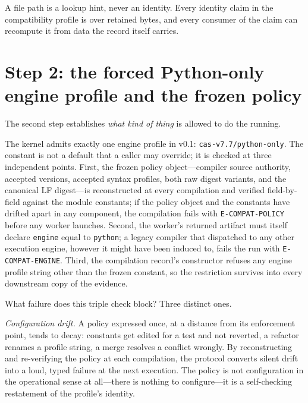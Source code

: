 \begin{ruleenv}\label{ch07:rule:no-path-authority}
A file path is a lookup hint, never an identity. Every identity claim in the compatibility profile is over retained bytes, and every consumer of the claim can recompute it from data the record itself carries.
\end{ruleenv}

\section{Step 2: the forced Python-only engine profile and the frozen policy}\label{ch07:step2}

The second step establishes \emph{what kind of thing} is allowed to do the running.

The kernel admits exactly one engine profile in v0.1: \texttt{cas-v7.7/python-only}. The constant is not a default that a caller may override; it is checked at three independent points. First, the frozen policy object---compiler source authority, accepted versions, accepted syntax profiles, both raw digest variants, and the canonical LF digest---is reconstructed at every compilation and verified field-by-field against the module constants; if the policy object and the constants have drifted apart in any component, the compilation fails with \texttt{E-COMPAT-POLICY} before any worker launches. Second, the worker's returned artifact must itself declare \texttt{engine} equal to \texttt{python}; a legacy compiler that dispatched to any other execution engine, however it might have been induced to, fails the run with \texttt{E-COMPAT-ENGINE}. Third, the compilation record's constructor refuses any engine profile string other than the frozen constant, so the restriction survives into every downstream copy of the evidence.

What failure does this triple check block? Three distinct ones.

\emph{Configuration drift.} A policy expressed once, at a distance from its enforcement point, tends to decay: constants get edited for a test and not reverted, a refactor renames a profile string, a merge resolves a conflict wrongly. By reconstructing and re-verifying the policy at each compilation, the protocol converts silent drift into a loud, typed failure at the next execution. The policy is not configuration in the operational sense at all---there is nothing to configure---it is a self-checking restatement of the profile's identity.

